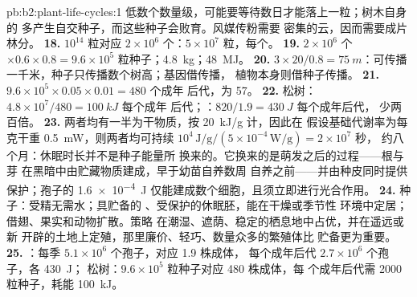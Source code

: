 \begin{solution}{pb:b2:plant-life-cycles:1}
低数个数量级，可能要等待数日才能落上一粒；树木自身的
多产生自交种子，而这些种子会败育。风媒传粉需要
密集的云，因而需要成片林分。
\textbf{18.} $10^{14}$ 粒对应 $2\times 10^{6}$ 个：$5\times
10^{7}$ 粒，每个。
\textbf{19.} $2\times 10^{6}$ 个 $\times 0.6\times 0.8 = 9.6\times
10^{5}$ 粒种子；\qty{4.8}{kg}；\qty{48}{MJ}。
\textbf{20.} $3\times 20/0.8 = \qty{75}{m}$：可传播
一千米，种子只传播数个树高；基因借传播，
植物本身则借种子传播。
\textbf{21.} $9.6\times 10^{5}\times 0.05\times 0.01 = 480$ 个成年
后代，为 57。
\textbf{22.} 松树：$4.8\times 10^{7}/480 = \qty{100}{kJ}$ 每个成年
后代；：$820/1.9 = \qty{430}{J}$ 每个成年后代，
少两百倍。
\textbf{23.} 两者均有一半为干物质，按 \qty{20}{kJ/g} 计，因此在
假设基础代谢率为每克干重 \qty{0.5}{mW}，则两者均可持续 $10^{4}\,
\text{J/g}/(5\times 10^{-4}\,\text{W/g}) = 2\times 10^{7}$ 秒，
约八个月：休眠时长并不是种子能量所
换来的。它换来的是萌发之后的过程——根与芽
在黑暗中由贮藏物质建成，早于幼苗自养数周
自养之前——并由种皮同时提供保护；孢子的
\qty{1.6e-4}{J} 仅能建成数个细胞，且须立即进行光合作用。
\textbf{24.} 种子：受精无需水；具贮备的
、受保护的休眠胚，能在干燥或季节性
环境中定居；借翅、果实和动物扩散。策略
在潮湿、遮荫、稳定的栖息地中占优，并在遥远或新
开辟的土地上定殖，那里廉价、轻巧、数量众多的繁殖体比
贮备更为重要。
\textbf{25.} ：每季 $5.1\times 10^{6}$ 个孢子，对应 1.9 株成体，
每个成年后代 $2.7\times 10^{6}$ 个孢子，各 \qty{430}{J}；
松树：$9.6\times 10^{5}$ 粒种子对应 480 株成体，每
个成年后代需 \num{2000} 粒种子，耗能 \qty{100}{kJ}。
\end{solution}
